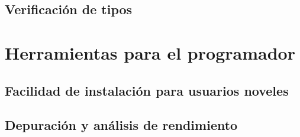 \subsection{Verificación de tipos}
\blindtext[1]

\section{Herramientas para el programador}
\subsection{Facilidad de instalación para usuarios noveles}
\blindtext[1]

\subsection{Depuración y análisis de rendimiento}
\blindtext[1]
